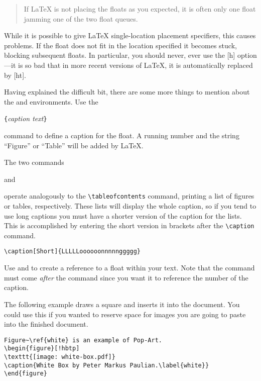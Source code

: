 \begin{quote}
If \LaTeX{} is not placing the floats as you expected,
it is often only one float jamming one of the two float queues.
\end{quote}

While it is possible to give \LaTeX{}  single-location placement
specifiers, this causes problems.  If the float does not fit in the
location specified it becomes stuck, blocking subsequent floats.
In particular, you should never, ever use the [h] option---it is so bad
that in more recent versions of \LaTeX, it is automatically replaced by
[ht].

\bigskip
\noindent Having explained the difficult bit, there are some more things to
mention about the  and  environments.
Use the

\begin{lscommand}
\verb|{|\emph{caption text}\verb|}|
\end{lscommand}

\noindent command to define a caption for the float. A running number and
the string ``Figure'' or ``Table'' will be added by \LaTeX.

The two commands

\begin{lscommand}
 and 
\end{lscommand}

\noindent operate analogously to the \verb|\tableofcontents| command,
printing a list of figures or tables, respectively.  These lists will
display the whole caption, so if you tend to use long captions
you must have a shorter version of the caption for the lists.
This is accomplished by entering the short version in brackets after
the \verb|\caption| command.
\begin{code}
\verb|\caption[Short]{LLLLLoooooonnnnnggggg}|
\end{code}

Use  and  to create a reference to a float within
your text. Note that the  command must come \emph{after} the
 command since you want it to reference the number of the
caption.

The following example draws a square and inserts it into the
document. You could use this if you wanted to reserve space for images
you are going to paste into the finished document.

\begin{code}
\begin{verbatim}
Figure~\ref{white} is an example of Pop-Art.
\begin{figure}[!hbtp]
\texttt{[image: white-box.pdf]}
\caption{White Box by Peter Markus Paulian.\label{white}}
\end{figure}
\end{verbatim}
\end{code}

